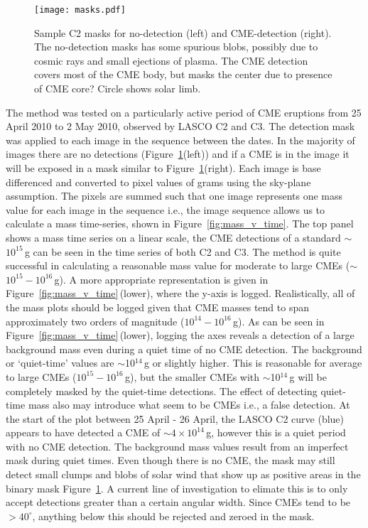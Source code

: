 \begin{figure}[h!]
\begin{center}
\texttt{[image: masks.pdf]}
\caption{Sample C2 masks for no-detection (left) and CME-detection (right). The no-detection masks has some spurious blobs, possibly due to cosmic rays and small ejections of plasma. The CME detection covers most of the CME body, but masks the center due to presence of CME core? Circle shows solar limb.}
\label{fig:masks}
\end{center}
\end{figure}
%
The method was tested on a particularly active period of CME eruptions from 25 April 2010 to 2 May 2010, observed by LASCO C2 and C3. The detection mask was applied to each image in the sequence between the dates. In the majority of images there are no detections (Figure~\ref{fig:masks}(left)) and if a CME is in the image it will be exposed in a mask similar to Figure~\ref{fig:masks}(right). Each image is base differenced and converted to pixel values of grams using the sky-plane assumption. The pixels are summed such that one image represents one mass value for each image in the sequence i.e., the image sequence allows us to calculate a mass time-series, shown in Figure~\ref{fig:mass_v_time}. The top panel shows a mass time series on a linear scale, the CME detections of a standard $\sim$$10^{15}$\,g can be seen in the time series of both C2 and C3. The method is quite successful in calculating a reasonable mass value for moderate to large CMEs ($\sim$$10^{15}-10^{16}$\,g). 
%
A more appropriate representation is given in Figure~\ref{fig:mass_v_time}\,(lower), where the y-axis is logged. Realistically, all of the mass plots should be logged given that CME masses tend to span approximately two orders of magnitude ($10^{14}-10^{16}$\,g). As can be seen in Figure~\ref{fig:mass_v_time}\,(lower), logging the axes reveals a detection of a large background mass even during a quiet time of no CME detection. The background or `quiet-time' values are $\sim$10$^{14}$\,g or slightly higher. This is reasonable for average to large CMEs ($10^{15}-10^{16}$\,g), but the smaller CMEs with $\sim$10$^{14}$\,g will be completely masked by the quiet-time detections. The effect of detecting quiet-time mass also may introduce what seem to be CMEs i.e., a false detection. At the start of the plot between 25 April - 26 April, the LASCO C2 curve (blue) appears to have detected a CME of $\sim4\times10^{14}$\,g, however this is a quiet period with no CME detection. The background mass values result from an imperfect mask during quiet times. Even though there is no CME, the mask may still detect small clumps and blobs of solar wind that show up as positive areas in the binary mask Figure~\ref{fig:masks}. A current line of investigation to elimate this is to only accept detections greater than a certain angular width. Since CMEs tend to be $>40^{\circ}$, anything below this should be rejected and zeroed in the mask.
